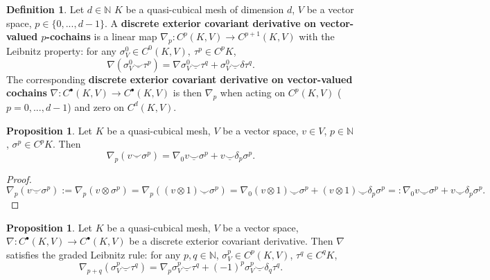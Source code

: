 \documentclass[fleqn]{article}
\theoremstyle{definition}
\newtheorem{proposition}[theorem]{Proposition}
\newtheorem{definition}[theorem]{Definition}
\newcommand{\N}{\mathbb{N}}
\newcommand{\usmile}{\underline{\smile}}
\begin{document}
\begin{definition}
  Let
    $d \in \N$
    $K$ be a quasi-cubical mesh of dimension $d$,
    $V$ be a vector space,
    $p \in \{0, ..., d - 1\}$.
  A \textbf{discrete exterior covariant derivative on vector-valued
  $p$-cochains} is a linear map
  $\nabla_p \colon C^p(K, V) \to C^{p + 1}(K, V)$ with the Leibnitz property:
  for any $\sigma_V^0 \in C^0(K, V),\ \tau^p \in C^p K$,
  \begin{equation}
    \nabla(\sigma_V^0 \usmile \tau^p)
    = \nabla \sigma_V^0 \usmile \tau^q + \sigma_V^0 \usmile \delta \tau^q.
  \end{equation}
  The corresponding
  \textbf{discrete exterior covariant derivative on vector-valued cochains}
  $\nabla \colon C^\bullet(K, V) \to C^\bullet(K, V)$
  is then $\nabla_p$ when acting on $C^p(K, V)$ ($p = 0, ..., d - 1$)
  and zero on $C^d(K, V)$.
\end{definition}

\begin{proposition}
  Let
    $K$ be a quasi-cubical mesh,
    $V$ be a vector space,
    $v \in V$,
    $p \in \N$,
    $\sigma^p \in C^p K$.
  Then
  \begin{equation}
    \nabla_p(v \usmile \sigma^p)
    = \nabla_0 v \usmile \sigma^p + v \usmile \delta_p \sigma^p.
  \end{equation}
\end{proposition}

\begin{proof}
  \begin{equation}
    \nabla_p(v \usmile \sigma^p)
    := \nabla_p(v \otimes \sigma^p)
    = \nabla_p((v \otimes 1) \usmile \sigma^p)
    = \nabla_0(v \otimes 1) \usmile \sigma^p
      + (v \otimes 1) \usmile \delta_p \sigma^p
    =: \nabla_0 v \usmile \sigma^p + v \usmile \delta_p \sigma^p.
  \end{equation}
\end{proof}

\begin{proposition}
  Let
    $K$ be a quasi-cubical mesh,
    $V$ be a vector space,
    $\nabla \colon C^\bullet(K, V) \to C^\bullet(K, V)$ be
      a discrete exterior covariant derivative.
  Then $\nabla$ satisfies the graded Leibnitz rule:
  for any $p, q \in \N$, $\sigma_V^p \in C^p(K, V)$, $\tau^q \in C^q K$, 
  \begin{equation}
    \nabla_{p + q}(\sigma_V^p \usmile \tau^q)
    = \nabla_p \sigma_V^p \usmile \tau^q
      + (-1)^p \sigma_V^p \usmile \delta_q \tau^q.
  \end{equation}
\end{proposition}
\end{document}
